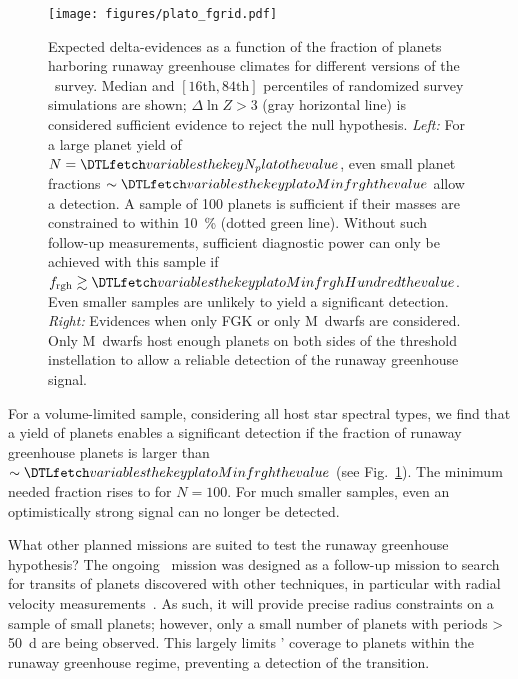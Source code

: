 \documentclass[twocolumn]{aastex631}
\begin{document}
    \begin{figure*}[ht!]
        \begin{centering}
            \texttt{[image: figures/plato\_fgrid.pdf]}
            \caption{
            Expected delta-evidences as a function of the fraction of planets harboring runaway greenhouse climates for different versions of the \plato\ survey.
            Median and $[16\mathrm{th}, 84\mathrm{th}]$ percentiles of randomized survey simulations are shown; $\Delta \ln Z > 3$ (gray horizontal line) is considered sufficient evidence to reject the null hypothesis.
            \textit{Left:} For a large planet yield of $N = \var{N_plato}$, even small planet fractions $\sim \var{platoMinfrgh}$ allow a detection.
                A sample of 100 planets is sufficient if their masses are constrained to within \SI{10}{\percent} (dotted green line).
                Without such follow-up measurements, sufficient diagnostic power can only be achieved with this sample if $f_\mathrm{rgh} \gtrsim \var{platoMinfrghHundred}$.
               Even smaller samples are unlikely to yield a significant detection.
            \textit{Right:} Evidences when only FGK or only M~dwarfs are considered.
                Only M~dwarfs host enough planets on both sides of the threshold instellation to allow a reliable detection of the runaway greenhouse signal.
            }
            \label{fig:plato_fgrid}
        \end{centering}
    \end{figure*}

For a volume-limited sample, considering all host star spectral types, we find that a yield of  planets enables a significant detection if the fraction of runaway greenhouse planets is larger than $\sim \var{platoMinfrgh}$ (see Fig.~\ref{fig:plato_fgrid}).
The minimum needed fraction rises to  for $N = 100$.
For much smaller samples, even an optimistically strong signal can no longer be detected.

What other planned missions are suited to test the runaway greenhouse hypothesis?
The ongoing \cheops\ mission was designed as a follow-up mission to search for transits of planets discovered with other techniques, in particular with radial velocity measurements~\citep{Benz2021}.
As such, it will provide precise radius constraints on a sample of small planets; however, only a small number of planets with periods \SI{> 50}{\day} are being observed.
This largely limits \cheops' coverage to planets within the runaway greenhouse regime, preventing a detection of the transition.
\end{document}
